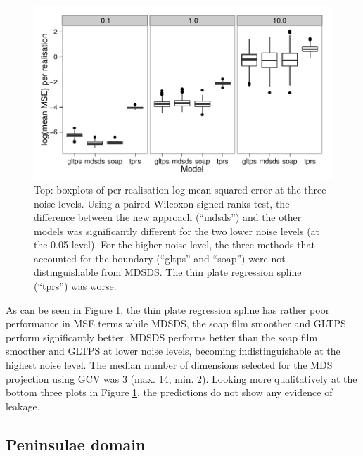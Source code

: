 \documentclass[smallextended]{svjour3}       %
\begin{document}
\begin{figure}
\centering
\includegraphics[width=\textwidth]{examples/ramsay/ramsay-result.pdf}
\caption{Top: boxplots of per-realisation log mean squared error at the three noise levels. Using a paired Wilcoxon signed-ranks test, the difference between the new approach (``mdsds'') and the other models was significantly different for the two lower noise levels (at the 0.05 level). For the higher noise level, the three methods that accounted for the boundary (``gltps'' and ``soap'') were not distinguishable from MDSDS. The thin plate regression spline (``tprs'') was worse.
\label{ramsay-results}}
\end{figure}

As can be seen in Figure \ref{ramsay-results}, the thin plate regression spline has rather poor performance in MSE terms while MDSDS, the soap film smoother and GLTPS perform significantly better. MDSDS performs better than the soap film smoother and GLTPS at lower noise levels, becoming indistinguishable at the highest noise level. The median number of dimensions selected for the MDS projection using GCV was 3 (max. 14, min. 2). Looking more qualitatively at the bottom three plots in Figure \ref{ramsay-results}, the predictions do not show any evidence of leakage.


\subsection{Peninsulae domain}
\end{document}
